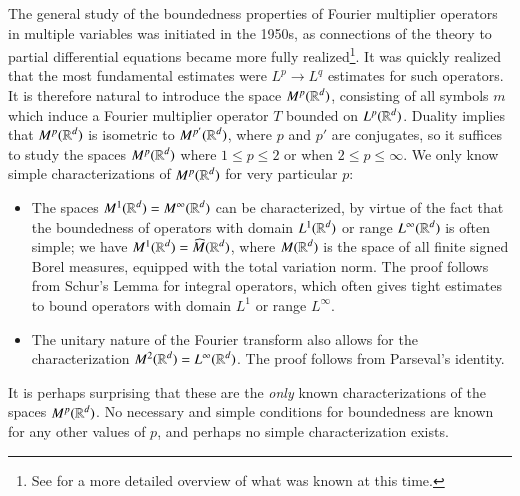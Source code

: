 The general study of the boundedness properties of Fourier multiplier operators in multiple variables was initiated in the 1950s, as connections of the theory to partial differential equations became more fully realized\footnote{See \cite{Hormander1} for a more detailed overview of what was known at this time.}. It was quickly realized that the most fundamental estimates were $L^p \to L^q$ estimates for such operators.
%
%
%
It is therefore natural to introduce the space $M^p(\operatorname{\mathbb{R}}^d)$, consisting of all symbols $m$ which induce a Fourier multiplier operator $T$ bounded on $L^p(\operatorname{\mathbb{R}}^d)$. Duality implies that $M^p(\operatorname{\mathbb{R}}^d)$ is isometric to $M^{p'}(\operatorname{\mathbb{R}}^d)$, where $p$ and $p'$ are conjugates, so it suffices to study the spaces $M^p(\operatorname{\mathbb{R}}^d)$ where $1 \leq p \leq 2$ or when $2 \leq p \leq \infty$. We only know simple characterizations of $M^p(\operatorname{\mathbb{R}}^d)$ for very particular $p$:
%
\begin{itemize}
    \item The spaces $M^1(\operatorname{\mathbb{R}}^d) = M^\infty(\operatorname{\mathbb{R}}^d)$ can be characterized, by virtue of the fact that the boundedness of operators with domain $L^1(\operatorname{\mathbb{R}}^d)$ or range $L^\infty(\operatorname{\mathbb{R}}^d)$ is often simple; we have $M^1(\operatorname{\mathbb{R}}^d) = \widehat{M}(\operatorname{\mathbb{R}}^d)$, where  $M(\operatorname{\mathbb{R}}^d)$ is the space of all finite signed Borel measures, equipped with the total variation norm. The proof follows from Schur's Lemma for integral operators, which often gives tight estimates to bound operators with domain $L^1$ or range $L^\infty$.

    \item The unitary nature of the Fourier transform also allows for the characterization $M^2(\operatorname{\mathbb{R}}^d) = L^\infty(\operatorname{\mathbb{R}}^d)$. The proof follows from Parseval's identity.
\end{itemize}
%
It is perhaps surprising that these are the \emph{only} known characterizations of the spaces $M^p(\operatorname{\mathbb{R}}^d)$. No necessary and simple conditions for boundedness are known for any other values of $p$, and perhaps no simple characterization exists.

